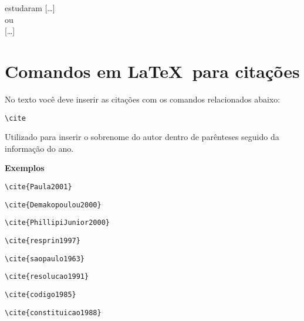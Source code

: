   estudaram [\ldots]\\
	
ou\\

[\ldots] \cite{Ando1990,Ferreira1989,SilvaRibeiro2001}  \\


\section{Comandos em \LaTeX\ para citações}


No texto você deve inserir as citações com os comandos relacionados abaixo:

\begin{alineas}
\item
\begin{verbatim}
\cite
\end{verbatim}

Utilizado para inserir o sobrenome do autor dentro de parênteses seguido da informação do ano.

\textbf{Exemplos} 

\begin{verbatim}
\cite{Paula2001}
\end{verbatim}
\cite{Paula2001}

\begin{verbatim}
\cite{Demakopoulou2000}
\end{verbatim}
\cite{Demakopoulou2000}

\begin{verbatim}
\cite{PhillipiJunior2000}
\end{verbatim}
\cite{PhillipiJunior2000}

\begin{verbatim}
\cite{resprin1997}
\end{verbatim}
\cite{resprin1997}

\begin{verbatim}
\cite{saopaulo1963}
\end{verbatim}
\cite{saopaulo1963}

\begin{verbatim}
\cite{resolucao1991}
\end{verbatim}
\cite{resolucao1991}

\begin{verbatim}
\cite{codigo1985}
\end{verbatim}
\cite{codigo1985}

\begin{verbatim}
\cite{constituicao1988}
\end{verbatim}
\cite{constituicao1988}


\end{alineas}
